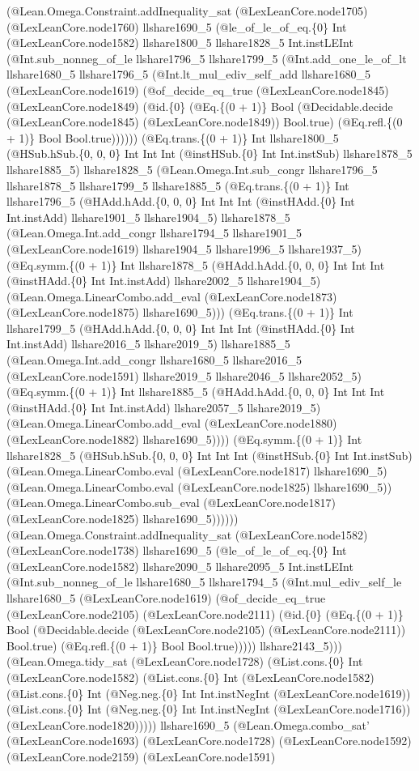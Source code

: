 \documentclass[11pt]{article}
\begin{document}
(@Lean.Omega.Constraint.addInequality\_sat (@LexLeanCore.node1705) (@LexLeanCore.node1760) llshare1690\_5 (@le\_of\_le\_of\_eq.\{0\} Int (@LexLeanCore.node1582) llshare1800\_5 llshare1828\_5 Int.instLEInt (@Int.sub\_nonneg\_of\_le llshare1796\_5 llshare1799\_5 (@Int.add\_one\_le\_of\_lt llshare1680\_5 llshare1796\_5 (@Int.lt\_mul\_ediv\_self\_add llshare1680\_5 (@LexLeanCore.node1619) (@of\_decide\_eq\_true (@LexLeanCore.node1845) (@LexLeanCore.node1849) (@id.\{0\} (@Eq.\{(0 + 1)\} Bool (@Decidable.decide (@LexLeanCore.node1845) (@LexLeanCore.node1849)) Bool.true) (@Eq.refl.\{(0 + 1)\} Bool Bool.true)))))) (@Eq.trans.\{(0 + 1)\} Int llshare1800\_5 (@HSub.hSub.\{0, 0, 0\} Int Int Int (@instHSub.\{0\} Int Int.instSub) llshare1878\_5 llshare1885\_5) llshare1828\_5 (@Lean.Omega.Int.sub\_congr llshare1796\_5 llshare1878\_5 llshare1799\_5 llshare1885\_5 (@Eq.trans.\{(0 + 1)\} Int llshare1796\_5 (@HAdd.hAdd.\{0, 0, 0\} Int Int Int (@instHAdd.\{0\} Int Int.instAdd) llshare1901\_5 llshare1904\_5) llshare1878\_5 (@Lean.Omega.Int.add\_congr llshare1794\_5 llshare1901\_5 (@LexLeanCore.node1619) llshare1904\_5 llshare1996\_5 llshare1937\_5) (@Eq.symm.\{(0 + 1)\} Int llshare1878\_5 (@HAdd.hAdd.\{0, 0, 0\} Int Int Int (@instHAdd.\{0\} Int Int.instAdd) llshare2002\_5 llshare1904\_5) (@Lean.Omega.LinearCombo.add\_eval (@LexLeanCore.node1873) (@LexLeanCore.node1875) llshare1690\_5))) (@Eq.trans.\{(0 + 1)\} Int llshare1799\_5 (@HAdd.hAdd.\{0, 0, 0\} Int Int Int (@instHAdd.\{0\} Int Int.instAdd) llshare2016\_5 llshare2019\_5) llshare1885\_5 (@Lean.Omega.Int.add\_congr llshare1680\_5 llshare2016\_5 (@LexLeanCore.node1591) llshare2019\_5 llshare2046\_5 llshare2052\_5) (@Eq.symm.\{(0 + 1)\} Int llshare1885\_5 (@HAdd.hAdd.\{0, 0, 0\} Int Int Int (@instHAdd.\{0\} Int Int.instAdd) llshare2057\_5 llshare2019\_5) (@Lean.Omega.LinearCombo.add\_eval (@LexLeanCore.node1880) (@LexLeanCore.node1882) llshare1690\_5)))) (@Eq.symm.\{(0 + 1)\} Int llshare1828\_5 (@HSub.hSub.\{0, 0, 0\} Int Int Int (@instHSub.\{0\} Int Int.instSub) (@Lean.Omega.LinearCombo.eval (@LexLeanCore.node1817) llshare1690\_5) (@Lean.Omega.LinearCombo.eval (@LexLeanCore.node1825) llshare1690\_5)) (@Lean.Omega.LinearCombo.sub\_eval (@LexLeanCore.node1817) (@LexLeanCore.node1825) llshare1690\_5)))))) (@Lean.Omega.Constraint.addInequality\_sat (@LexLeanCore.node1582) (@LexLeanCore.node1738) llshare1690\_5 (@le\_of\_le\_of\_eq.\{0\} Int (@LexLeanCore.node1582) llshare2090\_5 llshare2095\_5 Int.instLEInt (@Int.sub\_nonneg\_of\_le llshare1680\_5 llshare1794\_5 (@Int.mul\_ediv\_self\_le llshare1680\_5 (@LexLeanCore.node1619) (@of\_decide\_eq\_true (@LexLeanCore.node2105) (@LexLeanCore.node2111) (@id.\{0\} (@Eq.\{(0 + 1)\} Bool (@Decidable.decide (@LexLeanCore.node2105) (@LexLeanCore.node2111)) Bool.true) (@Eq.refl.\{(0 + 1)\} Bool Bool.true))))) llshare2143\_5))) (@Lean.Omega.tidy\_sat (@LexLeanCore.node1728) (@List.cons.\{0\} Int (@LexLeanCore.node1582) (@List.cons.\{0\} Int (@LexLeanCore.node1582) (@List.cons.\{0\} Int (@Neg.neg.\{0\} Int Int.instNegInt (@LexLeanCore.node1619)) (@List.cons.\{0\} Int (@Neg.neg.\{0\} Int Int.instNegInt (@LexLeanCore.node1716)) (@LexLeanCore.node1820))))) llshare1690\_5 (@Lean.Omega.combo\_sat' (@LexLeanCore.node1693) (@LexLeanCore.node1728) (@LexLeanCore.node1592) (@LexLeanCore.node2159) (@LexLeanCore.node1591) 
\end{document}
